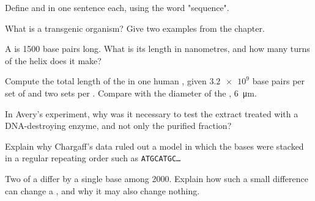 \begin{exercise}[$\star$]\label{exo:g10:universal-dna:4}
Define  and  in one sentence each, using the word
"sequence".
\end{exercise}

\begin{exercise}[$\star$]\label{exo:g10:universal-dna:5}
What is a transgenic organism? Give two examples from the chapter.
\end{exercise}

\begin{exercise}[$\star\star$]\label{exo:g10:universal-dna:6}
A  is 1500 base pairs long. What is its length in nanometres, and
how many turns of the helix does it make?
\end{exercise}

\begin{exercise}[$\star\star$]\label{exo:g10:universal-dna:7}
Compute the total length of the  in one human , given
$\num{3.2e9}$ base pairs per set of  and two sets per .
Compare with the diameter of the , \qty{6}{\micro m}.
\end{exercise}

\begin{exercise}[$\star\star$]\label{exo:g10:universal-dna:8}
In Avery's experiment, why was it necessary to test the extract
treated with a DNA-destroying enzyme, and not only the purified 
fraction?
\end{exercise}

\begin{exercise}[$\star\star$]\label{exo:g10:universal-dna:9}
Explain why Chargaff's data ruled out a model in which the bases were
stacked in a regular repeating order such as \texttt{ATGCATGC\dots}
\end{exercise}

\begin{exercise}[$\star\star$]\label{exo:g10:universal-dna:10}
Two  of a  differ by a single base among 2000. Explain how
such a small difference can change a , and why it may also
change nothing.
\end{exercise}

